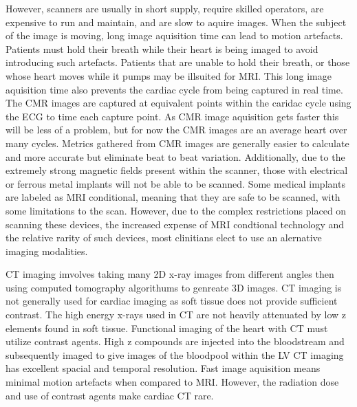 \documentclass[12pt]{article}
\begin{document}
However, scanners are usually in short supply, require skilled operators, are expensive to run and maintain, and are slow to aquire images.
When the subject of the image is moving, long image aquisition time can lead to motion artefacts.
Patients must hold their breath while their heart is being imaged to avoid introducing such artefacts.
Patients that are unable to hold their breath, or those whose heart moves while it pumps may be illsuited for MRI.
This long image aquisition time also prevents the cardiac cycle from being captured in real time.
The CMR images are captured at equivalent points within the caridac cycle using the ECG to time each capture point.
As CMR image aquisition gets faster this will be less of a problem, but for now the CMR images are an average heart over many cycles.
Metrics gathered from CMR images are generally easier to calculate and more accurate but eliminate beat to beat variation.
Additionally, due to the extremely strong magnetic fields present within the scanner, those with electrical or ferrous metal implants will not be able to be scanned.
Some medical implants are labeled as MRI conditional, meaning that they are safe to be scanned, with some limitations to the scan.
However, due to the complex restrictions placed on scanning these devices, the increased expense of MRI condtional technology and the relative rarity of such devices, most clinitians elect to use an alernative imaging modalities.\cite{mri_implants}

CT imaging imvolves taking many 2D x-ray images from different angles then using computed tomography algorithums to genreate 3D images.
CT imaging is not generally used for cardiac imaging as soft tissue does not provide sufficient contrast.
The high energy x-rays used in CT are not heavily attenuated by low z elements found in soft tissue.
Functional imaging of the heart with CT must utilize contrast agents\cite{ef_soa}.
High z compounds are injected into the bloodstream and subsequently imaged to give images of the bloodpool within the LV
CT imaging has excellent spacial and temporal resolution. 
Fast image aquisition means minimal motion artefacts when compared to MRI.
However, the radiation dose and use of contrast agents make cardiac CT rare.

\end{document}
